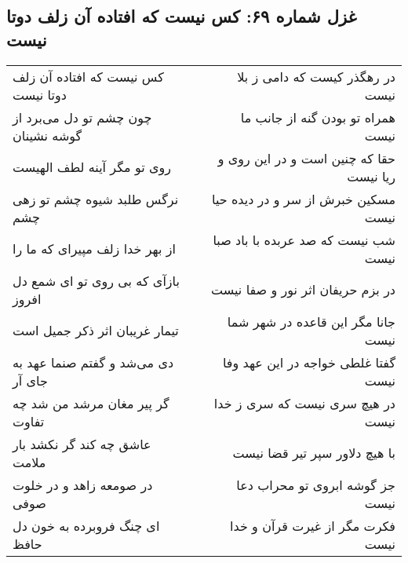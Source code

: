 \begin{center}
\section*{غزل شماره ۶۹: کس نیست که افتاده آن زلف دوتا نیست}
\label{sec:sh069}
\begin{longtable}{l p{0.5cm} r}
کس نیست که افتاده آن زلف دوتا نیست
&&
در رهگذر کیست که دامی ز بلا نیست
\\
چون چشم تو دل می‌برد از گوشه نشینان
&&
همراه تو بودن گنه از جانب ما نیست
\\
روی تو مگر آینه لطف الهیست
&&
حقا که چنین است و در این روی و ریا نیست
\\
نرگس طلبد شیوه چشم تو زهی چشم
&&
مسکین خبرش از سر و در دیده حیا نیست
\\
از بهر خدا زلف مپیرای که ما را
&&
شب نیست که صد عربده با باد صبا نیست
\\
بازآی که بی روی تو ای شمع دل افروز
&&
در بزم حریفان اثر نور و صفا نیست
\\
تیمار غریبان اثر ذکر جمیل است
&&
جانا مگر این قاعده در شهر شما نیست
\\
دی می‌شد و گفتم صنما عهد به جای آر
&&
گفتا غلطی خواجه در این عهد وفا نیست
\\
گر پیر مغان مرشد من شد چه تفاوت
&&
در هیچ سری نیست که سری ز خدا نیست
\\
عاشق چه کند گر نکشد بار ملامت
&&
با هیچ دلاور سپر تیر قضا نیست
\\
در صومعه زاهد و در خلوت صوفی
&&
جز گوشه ابروی تو محراب دعا نیست
\\
ای چنگ فروبرده به خون دل حافظ
&&
فکرت مگر از غیرت قرآن و خدا نیست
\\
\end{longtable}
\end{center}
